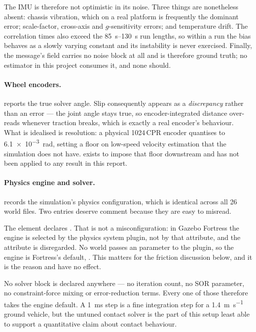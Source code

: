 The IMU is therefore not optimistic in its noise. Three things are nonetheless
absent: chassis vibration, which on a real platform is frequently the dominant
error; scale-factor, cross-axis and $g$-sensitivity errors; and temperature
drift. The correlation times also exceed the \SIrange{85}{130}{\second} run
lengths, so within a run the bias behaves as a slowly varying constant and its
instability is never exercised. Finally, the message's  field
carries no noise block at all and is therefore ground truth; no estimator in this
project consumes it, and none should.

\paragraph{Wheel encoders.}  reports the true solver
angle. Slip consequently appears as a \emph{discrepancy} rather than an error ---
the joint angle stays true, so encoder-integrated distance over-reads whenever
traction breaks, which is exactly a real encoder's behaviour. What is idealised
is resolution: a physical 1024\,CPR encoder quantises to \SI{6.1e-3}{\radian},
setting a floor on low-speed velocity estimation that the simulation does not
have.  exists to impose that floor downstream and has
not been applied to any result in this report.

\paragraph{Physics engine and solver.}  records the
simulation's physics configuration, which is identical across all 26 world files.
Two entries deserve comment because they are easy to misread.

The  element declares . That is not a
misconfiguration: in Gazebo Fortress the engine is selected by the physics system
plugin, not by that attribute, and the attribute is disregarded. No world passes
an  parameter to the plugin, so the engine is Fortress's default,
. This matters for the friction discussion below, and it is the
reason  and  have no effect.

No solver block is declared anywhere --- no iteration count, no SOR parameter, no
constraint-force mixing or error-reduction terms. Every one of those therefore
takes the engine default. A \SI{1}{\milli\second} step is a fine integration
step for a \SI{1.4}{\metre\per\second} ground vehicle, but the untuned contact
solver is the part of this setup least able to support a quantitative claim about
contact behaviour.


